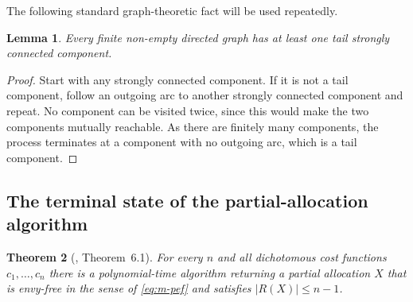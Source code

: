 \documentclass[sigconf,anonymous]{aamas}
\newcommand{\cost}{c}
\newcommand{\abs}[1]{\left\lvert#1\right\rvert}
\theoremstyle{acmplain}
\newtheorem{theorem}{Theorem}[section]
\newtheorem{lemma}[theorem]{Lemma}
\theoremstyle{acmdefinition}
\theoremstyle{acmplain}
\begin{document}
The following standard graph-theoretic fact will be used repeatedly.

\begin{lemma} \label{lem:tail-scc-exists} Every finite non-empty directed graph has at least one tail strongly connected component.
\end{lemma}
\begin{proof}
Start with any strongly connected component. If it is not a tail component, follow an outgoing arc to another strongly connected component and repeat. No component can be visited twice, since this would make the two components mutually reachable. As there are finitely many components, the process terminates at a component with no outgoing arc, which is a tail component.
\end{proof}


\subsection{The terminal state of the partial-allocation algorithm}
\label{sec:m-terminal}

\begin{theorem}[\cite{tao2025existence}, Theorem~6.1] \label{thm:m-twyz} For every $n$ and all dichotomous cost functions $\cost_1,\dots,\cost_n$ there is a polynomial-time algorithm returning a partial allocation $X$ that is envy-free in the sense of \eqref{eq:m-pef} and satisfies $\abs{R(X)} \le n-1$. \end{theorem}
\end{document}
